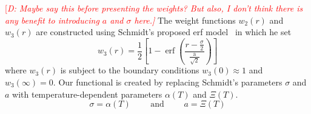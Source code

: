 \documentclass[double,12pt]{beavtex}
\newcommand\davidsays[1]{\textcolor{red}{[\it D: #1]}}
\begin{document}
\davidsays{Maybe say this before presenting the weights? But also, I don't think
there is any benefit to introducing $a$ and $\sigma$ here.} The weight functions $w_{2}(r)$ and $w_{3}(r)$ are constructed
using 
Schmidt's proposed erf model~\cite{schmidt2000fluid} in which he set
\begin{equation}
  w_3(r)=\frac{1}{2}\left[1-\operatorname{erf}\left(\frac{r-\frac{\sigma}{2}}{\frac{\text{a}}{\sqrt{2}}}\right)\right]
\end{equation} 
where $w_3(r)$ is subject to the boundary conditions $w_3(0)\approx{1}$ 
and $w_3(\infty)=0$. 
Our functional is  created by replacing Schmidt's parameters $\sigma$ 
and $a$ with temperature-dependent parameters $\alpha(T)$ and $\Xi(T)$.
\begin{equation}\sigma = \alpha(T)\text{~~~~~~~and~~~~~~~} a = \Xi(T)\end{equation}
\end{document}
